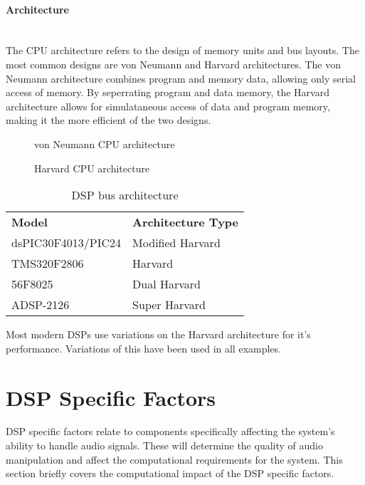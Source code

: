 \documentclass[titlepage]{scrartcl}
\begin{document}
    \paragraph{Architecture}~\\
    The CPU architecture refers to the design of memory units and bus layouts.
    The most common designs are von Neumann and Harvard architectures. The von
    Neumann architecture combines program and memory data, allowing only serial
    access of memory. By seperrating program and data memory, the Harvard
    architecture allows for simulataneous access of data and program memory,
    making it the more efficient of the two designs.~\parencite[p.320-321]{raf2014fdlm}
    \begin{figure}[H]
        \caption{von Neumann CPU architecture~\parencite[p.320]{raf2014fdlm}}
    \end{figure}
    \begin{figure}[H]
        \caption{Harvard CPU architecture~\parencite[p.321]{raf2014fdlm}}
    \end{figure}

    \begin{table}[H]
    \centering
    \caption{DSP bus architecture}
    \label{my-label}
    \begin{tabular}{ll}
        \textbf{Model}              & \textbf{Architecture Type}\\
        dsPIC30F4013/PIC24 & Modified Harvard\\
        TMS320F2806        & Harvard\\
        56F8025            & Dual Harvard\\
        ADSP-2126          & Super Harvard
    \end{tabular}
    \end{table}

    Most modern DSPs use variations on the Harvard architecture for it's
    performance. Variations of this have been used in all examples.

    \section{DSP Specific Factors}
    DSP specific factors relate to components specifically affecting the system's
    ability to handle audio signals. These will determine the quality of audio
    manipulation and affect the computational requirements for the system. This
    section briefly covers the computational impact of the DSP specific
    factors.
\end{document}

